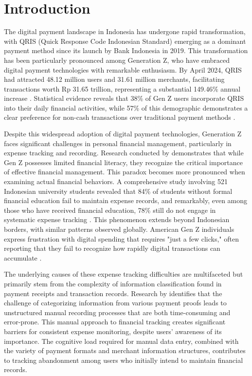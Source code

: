 \section{Introduction}

The digital payment landscape in Indonesia has undergone rapid transformation, with QRIS (Quick Response Code Indonesian Standard) emerging as a dominant payment method since its launch by Bank Indonesia in 2019. This transformation has been particularly pronounced among Generation Z, who have embraced digital payment technologies with remarkable enthusiasm. By April 2024, QRIS had attracted 48.12 million users and 31.61 million merchants, facilitating transactions worth Rp 31.65 trillion, representing a substantial 149.46\% annual increase \cite{CNNqris2024, Tempo2024BIQRIS}. Statistical evidence reveals that 38\% of Gen Z users incorporate QRIS into their daily financial activities, while 57\% of this demographic demonstrates a clear preference for non-cash transactions over traditional payment methods \cite{qris2023goodstats, jawapos2024qris}.

Despite this widespread adoption of digital payment technologies, Generation Z faces significant challenges in personal financial management, particularly in expense tracking and recording. Research conducted by \cite{beck2019managing} demonstrates that while Gen Z possesses limited financial literacy, they recognize the critical importance of effective financial management. This paradox becomes more pronounced when examining actual financial behaviors. A comprehensive study involving 521 Indonesian university students revealed that 84\% of students without formal financial education fail to maintain expense records, and remarkably, even among those who have received financial education, 78\% still do not engage in systematic expense tracking \cite{johan2021effect}. This phenomenon extends beyond Indonesian borders, with similar patterns observed globally. American Gen Z individuals express frustration with digital spending that requires "just a few clicks," often reporting that they fail to recognize how rapidly digital transactions can accumulate \cite{lewis2019follow}.

The underlying causes of these expense tracking difficulties are multifaceted but primarily stem from the complexity of information classification found in payment receipts and transaction records. Research by \cite{kaye2014money} identifies that the challenge of categorizing information from various payment proofs leads to unstructured manual recording processes that are both time-consuming and error-prone. This manual approach to financial tracking creates significant barriers for consistent expense monitoring, despite users' awareness of its importance. The cognitive load required for manual data entry, combined with the variety of payment formats and merchant information structures, contributes to tracking abandonment among users who initially intend to maintain financial records.

